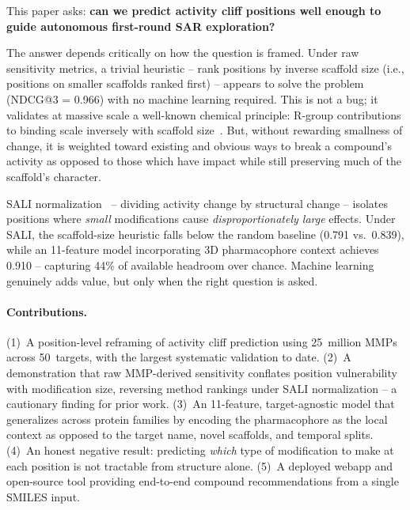 \documentclass[sigconf, nonacm]{acmart}
\begin{document}
This paper asks: \textbf{can we predict activity cliff positions well enough to guide autonomous first-round SAR exploration?}

The answer depends critically on how the question is framed. Under raw sensitivity metrics, a trivial heuristic -- rank positions by inverse scaffold size (i.e., positions on smaller scaffolds ranked first) -- appears to solve the problem (NDCG@3 = 0.966) with no machine learning required. This is not a bug; it validates at massive scale a well-known chemical principle: R-group contributions to binding scale inversely with scaffold size~\cite{Hopkins2004}. But, without rewarding smallness of change, it is weighted toward existing and obvious ways to break a compound's activity as opposed to those which have impact while still preserving much of the scaffold's character.

SALI normalization~\cite{Guha2008} -- dividing activity change by structural change -- isolates positions where \textit{small} modifications cause \textit{disproportionately large} effects. Under SALI, the scaffold-size heuristic falls below the random baseline (0.791 vs.\ 0.839), while an 11-feature model incorporating 3D pharmacophore context achieves 0.910 -- capturing 44\% of available headroom over chance. Machine learning genuinely adds value, but only when the right question is asked.

\paragraph{Contributions.} (1)~A position-level reframing of activity cliff prediction using 25~million MMPs across 50~targets, with the largest systematic validation to date. (2)~A demonstration that raw MMP-derived sensitivity conflates position vulnerability with modification size, reversing method rankings under SALI normalization -- a cautionary finding for prior work. (3)~An 11-feature, target-agnostic model that generalizes across protein families by encoding the pharmacophore as the local context as opposed to the target name, novel scaffolds, and temporal splits. (4)~An honest negative result: predicting \textit{which} type of modification to make at each position is not tractable from structure alone. (5)~A deployed webapp and open-source tool providing end-to-end compound recommendations from a single SMILES input.

\end{document}
